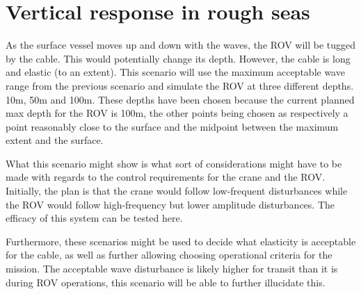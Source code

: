 \documentclass[class=article, crop=false, draft=true]{standalone}
\begin{document}
\section{Vertical response in rough seas}
As the surface vessel moves up and down with the waves, the ROV will be tugged by the cable. This would potentially change its depth. However, the cable is long and elastic (to an extent). This scenario will use the maximum acceptable wave range from the previous scenario and simulate the ROV at three different depths. 10m, 50m and 100m. These depths have been chosen because the current planned max depth for the ROV is 100m, the other points being chosen as respectively a point reasonably close to the surface and the midpoint between the maximum extent and the surface.

What this scenario might show is what sort of considerations might have to be made with regards to the control requirements for the crane and the ROV. Initially, the plan is that the crane would follow low-frequent disturbances while the ROV would follow high-frequency but lower amplitude disturbances. The efficacy of this system can be tested here.

Furthermore, these scenarios might be used to decide what elasticity is acceptable for the cable, as well as further allowing choosing operational criteria for the mission. The acceptable wave disturbance is likely higher for transit than it is during ROV operations, this scenario will be able to further illucidate this.
\end{document}

